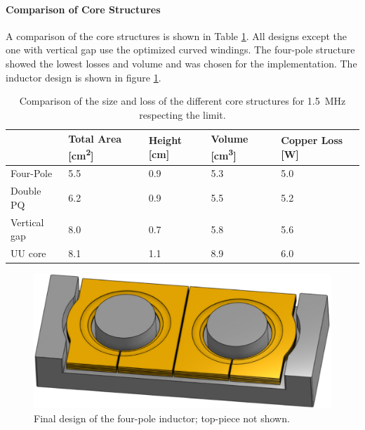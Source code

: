 \documentclass{IPEC2026}
\newcommand{\sbl}[1]{\glssymbol{#1}}
\begin{document}
\paragraph{Comparison of Core Structures}
A comparison of the core structures is shown in Table \ref{tab:InductorComparison}. All designs except the one with vertical gap use the optimized curved windings. The four-pole structure showed the lowest losses and volume and was chosen for the implementation. The inductor design is shown in figure \ref{fig:Four-Pole-3d}.
\begin{table}
  \centering
  \caption{Comparison of the size and loss of the different core structures for \qty{1.5}{\MHz} respecting the \sbl{Hdc} limit.}
    \begin{tabularx}{\columnwidth}{|l|X|X|X|X|}
      \hline
          & {Total Area [\unit{\cm\squared}]} & {Height [\unit{\cm}]} & {Volume [\unit{\cubic\cm}]} & {Copper Loss [\unit{\W}]} \\
      \hline
      \hline
      Four-Pole & 5.5 & 0.9 & 5.3 & 5.0 \\
      \hline
      Double PQ & 6.2 & 0.9 & 5.5 & 5.2 \\
      \hline
      Vertical gap & 8.0 & 0.7 & 5.8 & 5.6 \\
      \hline
      UU core & 8.1 & 1.1 & 8.9 & 6.0 \\
      \hline
    \end{tabularx}%
  \label{tab:InductorComparison}%
\end{table}%

\begin{figure}
  \centering
  \includegraphics[width=0.6\columnwidth]{figures/Four-Pole-3d.png}
  \caption{Final design of the four-pole inductor; top-piece not shown.}
  \label{fig:Four-Pole-3d}
\end{figure}
\end{document}

